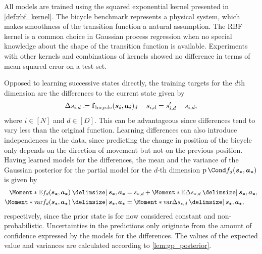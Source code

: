 All models are trained using the squared exponential kernel presented in \cref{def:rbf_kernel}.
The bicycle benchmark represents a physical system, which makes smoothness of the transition function a natural assumption.
The RBF kernel is a common choice in Gaussian process regression when no special knowledge about the shape of the transition function is available.
Experiments with other kernels and combinations of kernels showed no difference in terms of mean squared error on a test set.

Opposed to learning successive states directly, the training targets for the $d$th dimension are the differences to the current state given by
\begin{align}
    \Delta s_{i,d} \coloneqq \operatorname{\operatorname{\mathbf{f}}_{\text{bicycle}}}(\bm{s_i}, \bm{a_i})_d - s_{i,d} = s_{i,d }^\prime - s_{i,d},
\end{align}
where $i \in [N]$ and $d \in [D]$.
This can be advantageous since differences tend to vary less than the original function.
Learning differences can also introduce independences in the data, since predicting the change in position of the bicycle only depends on the direction of movement but not on the previous position.
Having learned models for the differences, the mean and the variance of the Gaussian posterior for the partial model for the $d$-th dimension $\Prob{f_d(\mat{s_\ast}, \mat{a_\ast})}$ is given by
\begin{align}
    \begin{split}
        \Moment*{\E}{f_d(\mat{s_\ast}, \mat{a_\ast}) \given \mat{s_\ast}, \mat{a_\ast}} &= s_{\ast,d} + \Moment*{\E}{\Delta s_{\ast,d} \given \mat{s_\ast}, \mat{a_\ast}}, \\
        \Moment*{\var}{f_d(\mat{s_\ast}, \mat{a_\ast}) \given \mat{s_\ast}, \mat{a_\ast}} &= \Moment*{\var}{\Delta s_{\ast,d} \given \mat{s_\ast}, \mat{a_\ast}},
    \end{split}
\end{align}
respectively, since the prior state is for now considered constant and non-probabilistic.
Uncertainties in the predictions only originate from the amount of confidence expressed by the models for the differences.
The values of the expected value and variances are calculated according to \cref{lem:gp_posterior}.

